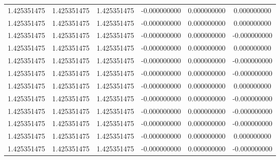\documentclass[fleqn]{article}
\begin{document}
\begin{enumerate}
\begin{enumerate}[label=\roman*.]
{\begin{tabular}{ |c|c|c|c|c|c| }
							1.425351475&1.425351475&1.425351475&-0.000000000&0.000000000&0.000000000\\
							1.425351475&1.425351475&1.425351475&-0.000000000&0.000000000&0.000000000\\
							1.425351475&1.425351475&1.425351475&-0.000000000&0.000000000&-0.000000000\\
							1.425351475&1.425351475&1.425351475&-0.000000000&0.000000000&0.000000000\\
							1.425351475&1.425351475&1.425351475&-0.000000000&0.000000000&-0.000000000\\
							1.425351475&1.425351475&1.425351475&-0.000000000&0.000000000&-0.000000000\\
							1.425351475&1.425351475&1.425351475&-0.000000000&0.000000000&0.000000000\\
							1.425351475&1.425351475&1.425351475&-0.000000000&0.000000000&-0.000000000\\
							1.425351475&1.425351475&1.425351475&-0.000000000&0.000000000&-0.000000000\\
							1.425351475&1.425351475&1.425351475&-0.000000000&0.000000000&-0.000000000\\
							1.425351475&1.425351475&1.425351475&-0.000000000&0.000000000&0.000000000\\
							1.425351475&1.425351475&1.425351475&-0.000000000&0.000000000&-0.000000000\\


\end{tabular}}
\end{enumerate}
\end{enumerate}
\end{document}
